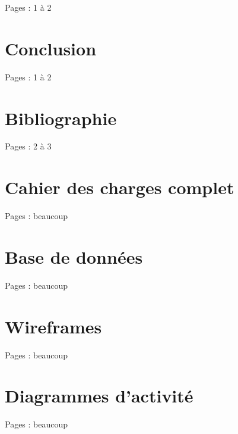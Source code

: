 \documentclass{eplmastersthesis_FR}
\begin{document}
			Pages : 1 à 2

	\chapter{Conclusion}

		Pages : 1 à 2

	\chapter*{Bibliographie}

		Pages : 2 à 3

	\appendix

	\chapter{Cahier des charges complet}

		Pages : beaucoup

	\chapter{Base de données}

		Pages : beaucoup

	\chapter{Wireframes}

		Pages : beaucoup

	\chapter{Diagrammes d'activité}

		Pages : beaucoup

	\setlength{\parskip}{0em}
	\backcoverpage
\end{document}
